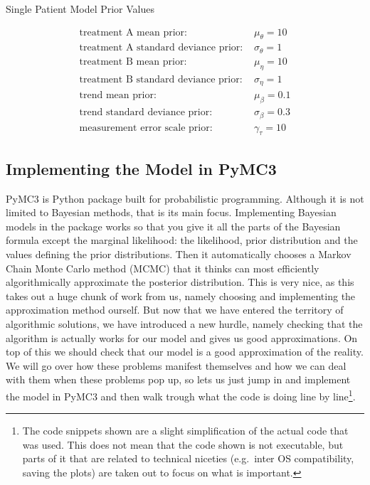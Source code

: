 \documentclass[12pt,a4paper,leqno]{report}
\theoremstyle{plain}
\theoremstyle{definition}
\theoremstyle{remark}
\begin{document}
\begin{table}[H]
    \caption{Single Patient Model Prior Values}\label{singlelpatientmodelpriorvalues}
    \begin{align}\label{}
        \text{treatment A mean prior: } & \mu_{\theta} = 10 \nonumber \\
        \text{treatment A standard deviance prior: } & \sigma_{\theta} = 1 \nonumber \\
        \text{treatment B mean prior: } & \mu_{\eta} = 10 \nonumber \\
        \text{treatment B standard deviance prior: } & \sigma_{\eta} = 1 \nonumber \\
        \text{trend mean prior: } & \mu_{\beta} = 0.1 \nonumber \\
        \text{trend standard deviance prior: } & \sigma_{\beta} = 0.3 \nonumber \\
        \text{measurement error scale prior: } & \gamma_{\tau} = 10 \nonumber
    \end{align}
\end{table}

\subsection{Implementing the Model in PyMC3}

PyMC3 is Python package built for probabilistic programming. Although it is not
limited to Bayesian methods, that is its main focus. Implementing Bayesian models in
the package works so that you give it all the parts of the Bayesian formula except the
marginal likelihood: the likelihood, prior
distribution and the values defining the prior distributions. Then it automatically
chooses a Markov Chain Monte Carlo method (MCMC) that it thinks can most efficiently
algorithmically approximate the posterior distribution. This is very nice, as this takes out a
huge chunk of work from us, namely choosing and implementing the approximation method
ourself. But now that we have entered the territory of algorithmic solutions, we have
introduced a new hurdle, namely checking that the algorithm is actually works for our
model and gives us good approximations. On top of this we should check that our model is a good
approximation of the reality. We will go over how these problems manifest themselves and
how we can deal with them when these problems pop up, so lets us just jump in and
implement the model in PyMC3 and then walk trough what the code is
doing line by line\footnote{The code snippets shown are a
slight simplification of the actual code that was used. This does not mean
that the code shown is not executable, but parts of it that are related to technical niceties
(e.g.\ inter OS compatibility, saving the plots) are taken out to focus on what is
important.}.
\end{document}
